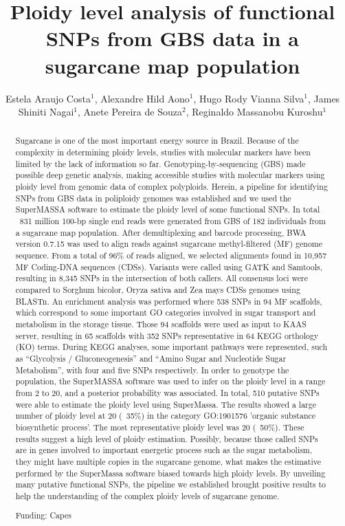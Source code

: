 \documentclass[twoside]{article}
\title{\vspace{-15mm}\fontsize{24pt}{10pt}\selectfont\textbf{Ploidy level analysis of functional SNPs from GBS data in a sugarcane map population}} %
\author{Estela Araujo Costa$^1$, Alexandre Hild Aono$^1$, Hugo Rody Vianna Silva$^1$, James Shiniti Nagai$^1$, Anete Pereira de Souza$^2$, Reginaldo Massanobu Kuroshu$^1$}
\affil{1 UNIFESP\\ 2 UNICAMP\\ }
\date{}
\begin{document}
\maketitle %

\thispagestyle{fancy} %


\begin{abstract}
Sugarcane is one of the most important energy source in Brazil.  Because of the complexity in determining ploidy levels, studies with molecular markers have been limited by the lack of information so far. Genotyping-by-sequencing (GBS) made possible deep genetic analysis, making accessible studies with molecular markers using ploidy level from genomic data of complex polyploids. Herein, a pipeline for identifying SNPs from GBS data in poliploidy genomes was established and we used the SuperMASSA software to estimate the ploidy level of some functional SNPs. In total ~831 million 100-bp single end reads were generated from GBS of 182 individuals from a sugarcane map population. After demultiplexing and barcode processing, BWA version 0.7.15 was used to align reads against sugarcane methyl-filtered (MF) genome sequence. From a total of 96\% of reads aligned, we selected alignments found in 10,957 MF Coding-DNA sequences (CDSs). Variants were called using GATK and Samtools, resulting in 8,345 SNPs in the intersection of both callers. All consensus loci were compared to Sorghum bicolor, Oryza sativa and Zea mays CDSs genomes using BLASTn. An enrichment analysis was performed where 538 SNPs in 94 MF scaffolds, which correspond to some important GO categories involved in sugar transport and metabolism in the storage tissue. Those 94 scaffolds were used as input to KAAS server, resulting in 65 scaffolds with 352 SNPs representative in 64 KEGG orthology (KO) terms. During KEGG analyses, some important pathways were represented, such as ``Glycolysis / Gluconeogenesis'' and ``Amino Sugar and Nucleotide Sugar Metabolism'', with four and five SNPs respectively. In order to genotype the population, the SuperMASSA software was used to infer on the ploidy level in a range from 2 to 20, and a posterior probability was associated. In total, 510 putative SNPs were able to estimate the ploidy level using SuperMassa. The results showed a large number of ploidy level at 20 (~35\%) in the category GO:1901576 'organic substance biosynthetic process'. The most representative ploidy level was 20 (~50\%). These results suggest a high level of ploidy estimation. Possibly, because those called SNPs are in genes involved to important energetic process such as the sugar metabolism, they might have multiple copies in the sugarcane genome, what makes the estimative performed by the SuperMassa software biased towards high ploidy levels. By unveiling many putative functional SNPs, the pipeline we established brought positive results to help the understanding of the complex ploidy levels of sugarcane genome.

Funding: Capes
\end{abstract}
\end{document}
